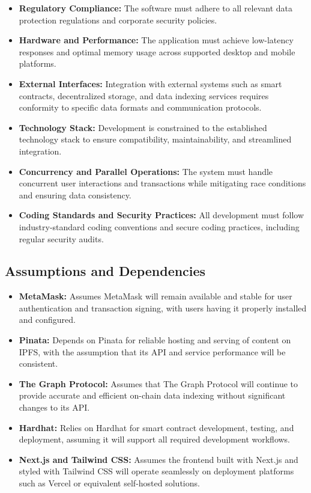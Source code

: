 \documentclass[a4paper,12pt]{article}
\begin{document}
\begin{itemize}
    \item \textbf{Regulatory Compliance:} The software must adhere to all relevant data protection regulations and corporate security policies.
    \item \textbf{Hardware and Performance:} The application must achieve low-latency responses and optimal memory usage across supported desktop and mobile platforms.
    \item \textbf{External Interfaces:} Integration with external systems such as smart contracts, decentralized storage, and data indexing services requires conformity to specific data formats and communication protocols.
    \item \textbf{Technology Stack:} Development is constrained to the established technology stack to ensure compatibility, maintainability, and streamlined integration.
    \item \textbf{Concurrency and Parallel Operations:} The system must handle concurrent user interactions and transactions while mitigating race conditions and ensuring data consistency.
    \item \textbf{Coding Standards and Security Practices:} All development must follow industry-standard coding conventions and secure coding practices, including regular security audits.
\end{itemize}

\subsection{Assumptions and Dependencies}

\begin{itemize}
    \item \textbf{MetaMask:} Assumes MetaMask will remain available and stable for user authentication and transaction signing, with users having it properly installed and configured.
    \item \textbf{Pinata:} Depends on Pinata for reliable hosting and serving of content on IPFS, with the assumption that its API and service performance will be consistent.
    \item \textbf{The Graph Protocol:} Assumes that The Graph Protocol will continue to provide accurate and efficient on-chain data indexing without significant changes to its API.
    \item \textbf{Hardhat:} Relies on Hardhat for smart contract development, testing, and deployment, assuming it will support all required development workflows.
    \item \textbf{Next.js and Tailwind CSS:} Assumes the frontend built with Next.js and styled with Tailwind CSS will operate seamlessly on deployment platforms such as Vercel or equivalent self-hosted solutions.
\end{itemize}
\end{document}

